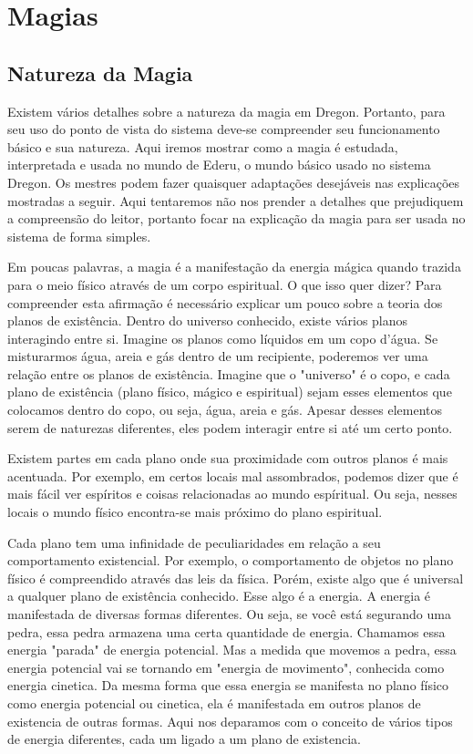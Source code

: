 
\chapter{Magias}
\label{Cap:Magias}


\section{Natureza da Magia}

Existem vários detalhes sobre a natureza da magia em Dregon. Portanto, para seu uso do ponto de vista do sistema deve-se compreender seu funcionamento básico e sua natureza. Aqui iremos mostrar como a magia é estudada, interpretada e usada no mundo de Ederu, o mundo básico usado no sistema Dregon. Os mestres podem fazer quaisquer adaptações desejáveis nas explicações mostradas a seguir. Aqui tentaremos não nos prender a detalhes que prejudiquem a compreensão do leitor, portanto focar na explicação da magia para ser usada no sistema de forma simples.

Em poucas palavras, a magia é a manifestação da energia mágica quando trazida para o meio físico através de um corpo espiritual. O que isso quer dizer? Para compreender esta afirmação é necessário explicar um pouco sobre a teoria dos planos de existência. Dentro do universo conhecido, existe vários planos interagindo entre si. Imagine os planos como líquidos em um copo d'água. Se misturarmos água, areia e gás dentro de um recipiente, poderemos ver uma relação entre os planos de existência. Imagine que o "universo" é o copo, e cada plano de existência (plano físico, mágico e espiritual) sejam esses elementos que colocamos dentro do copo, ou seja, água, areia e gás. Apesar desses elementos serem de naturezas diferentes, eles podem interagir entre si até um certo ponto.

Existem partes em cada plano onde sua proximidade com outros planos é mais acentuada. Por exemplo, em certos locais mal assombrados, podemos dizer que é mais fácil ver espíritos e coisas relacionadas ao mundo espíritual. Ou seja, nesses locais o mundo físico encontra-se  mais próximo do plano espiritual.

Cada plano tem uma infinidade de peculiaridades em relação a seu comportamento existencial. Por exemplo, o comportamento de objetos no plano físico é compreendido através das leis da física. Porém, existe algo que é universal a qualquer plano de existência conhecido. Esse algo é a energia. A energia é manifestada de diversas formas diferentes. Ou seja, se você está segurando uma pedra, essa pedra armazena uma certa quantidade de energia. Chamamos essa energia "parada" de energia potencial. Mas a medida que movemos a pedra, essa energia potencial vai se tornando em "energia de movimento", conhecida como energia cinetica. Da mesma forma que essa energia se manifesta no plano físico como energia potencial ou cinetica, ela é manifestada em outros planos de existencia de outras formas. Aqui nos deparamos com o conceito de vários tipos de energia diferentes, cada um ligado a um plano de existencia.

